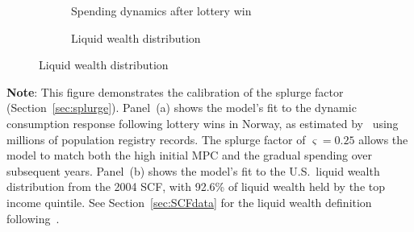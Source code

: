 \documentclass{econsocart}
\begin{document}
\begin{figure}[H]
  \centering
  \caption{\pregenmark Model fit to spending behavior and wealth distribution}
  \label{fig:splurge_estimation} %
  \noindent\begin{minipage}{\textwidth}
    \centering
    \begin{subfigure}[b]{.48\linewidth}
      \centering
      \caption{Spending dynamics after lottery win}
      \label{fig:aggmpclotterywin} %
    \end{subfigure}
    \hfill
    \begin{subfigure}[b]{.48\linewidth}
      \centering
      \caption{Liquid wealth distribution}
      \label{fig:liquwealthdistribution} %
    \end{subfigure}
  \end{minipage}
\end{figure}
\noindent\parbox{\textwidth}{\footnotesize
  \textbf{Note}: This figure demonstrates the calibration of the splurge factor (Section~\ref{sec:splurge}).
  Panel~(a) shows the model's fit to the dynamic consumption response following lottery wins in Norway,
  as estimated by~\cite{fagereng-mpc-2021} using millions of population registry records.
  The splurge factor of $\varsigma = 0.25$ allows the model to match both the high initial MPC
  and the gradual spending over subsequent years.
  Panel~(b) shows the model's fit to the U.S.\ liquid wealth distribution from the 2004 SCF,
  with 92.6\% of liquid wealth held by the top income quintile.
  See Section~\ref{sec:SCFdata} for the liquid wealth definition following~\cite{kaplan2014model}.
}

\vspace{0.5em}  
\end{document}
